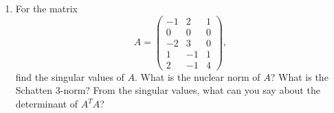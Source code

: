\documentclass[11pt]{article}
\begin{document}
\begin{enumerate}
	\item For the matrix
	      \[A =
		      \begin{pmatrix}
			      -1 & 2  & 1 \\
			      0  & 0  & 0 \\
			      -2 & 3  & 0 \\
			      1  & -1 & 1 \\
			      2  & -1 & 4
		      \end{pmatrix},
	      \]
	      find the singular values of \(A\).  What is the nuclear norm of \(A\)?  What is the Schatten 3-norm?  From the singular values, what can you say about the determinant of \(A^TA\)?
\end{enumerate}
\end{document}
